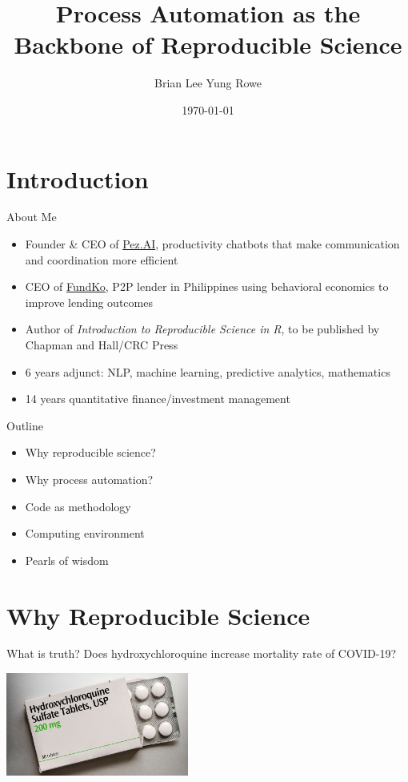\documentclass{beamer}
\title{Process Automation as the Backbone of Reproducible Science}
\date{\today}
\author{Brian Lee Yung Rowe}
\institute{Founder \& CEO, Pez.AI\\ CEO, FundKo}
\begin{document}
 
\maketitle 

\section{Introduction} 
\begin{frame}{About Me}

\begin{itemize}
\item Founder \& CEO of \href{https://pez.ai}{Pez.AI}, productivity chatbots that make communication and coordination more efficient
\item CEO of \href{https://fundko.com}{FundKo}, P2P lender in Philippines using behavioral economics to improve lending outcomes
\item Author of \emph{Introduction to Reproducible Science in R}, to be published by Chapman and Hall/CRC Press
\item 6 years adjunct: NLP, machine learning, predictive analytics, mathematics
\item 14 years quantitative finance/investment management
\end{itemize}
\end{frame} 


\begin{frame}{Outline}
\begin{itemize}
\item Why reproducible science?
\item Why process automation?
\item Code as methodology
\item Computing environment
\item Pearls of wisdom

\end{itemize} 
\end{frame} 


\section{Why Reproducible Science}

\begin{frame}{What is truth?}
Does hydroxychloroquine increase mortality rate of COVID-19?

\includegraphics[width=6cm]{images/hydroxychloroquine}

\end{frame}
\end{document}
